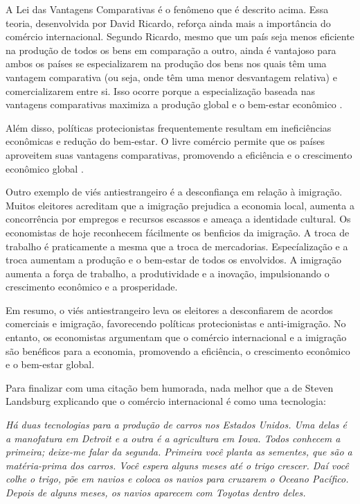 A Lei das Vantagens Comparativas é o fenômeno que é descrito acima. Essa teoria, desenvolvida por David Ricardo, reforça ainda mais a importância do comércio internacional. Segundo Ricardo, mesmo que um país seja menos eficiente na produção de todos os bens em comparação a outro, ainda é vantajoso para ambos os países se especializarem na produção dos bens nos quais têm uma vantagem comparativa (ou seja, onde têm uma menor desvantagem relativa) e comercializarem entre si. Isso ocorre porque a especialização baseada nas vantagens comparativas maximiza a produção global e o bem-estar econômico \cite{ricardo1817principles}.

Além disso, políticas protecionistas frequentemente resultam em ineficiências econômicas e redução do bem-estar. O livre comércio permite que os países aproveitem suas vantagens comparativas, promovendo a eficiência e o crescimento econômico global \cite{bhagwati2003free}.

Outro exemplo de viés antiestrangeiro é a desconfiança em relação à imigração. Muitos eleitores acreditam que a imigração prejudica a economia local, aumenta a concorrência por empregos e recursos escassos e ameaça a identidade cultural. Os economistas de hoje reconhecem fácilmente os benficios da imigração. A troca de trabalho é praticamente a mesma que a troca de mercadorias. Especíalização e a troca aumentam a produção e o bem-estar de todos os envolvidos. A imigração aumenta a força de trabalho, a produtividade e a inovação, impulsionando o crescimento econômico e a prosperidade.

Em resumo, o viés antiestrangeiro leva os eleitores a desconfiarem de acordos comerciais e imigração, favorecendo políticas protecionistas e anti-imigração. No entanto, os economistas argumentam que o comércio internacional e a imigração são benéficos para a economia, promovendo a eficiência, o crescimento econômico e o bem-estar global.

Para finalizar com uma citação bem humorada, nada melhor que a de Steven Landsburg explicando que o comércio internacional é como uma tecnologia:

\begin{citacao}
    \textit{
        Há duas tecnologias para a produção de carros nos Estados Unidos. Uma delas é a manofatura em Detroit e a outra é a agricultura em Iowa. Todos conhecem a primeira; deixe-me falar da segunda. Primeira você planta as sementes, que são a matéria-prima dos carros. Você espera alguns meses até o trigo crescer. Daí você colhe o trigo, põe em navios e coloca os navios para cruzarem o Oceano Pacífico. Depois de alguns meses, os navios aparecem com Toyotas dentro deles.
    } \newline
    \cite{landsburg2012armchair}
\end{citacao}


